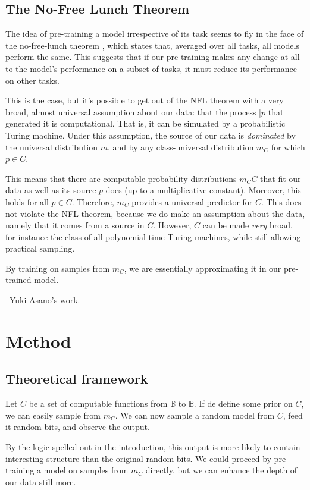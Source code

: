 \documentclass{article} %
\newcommand{\B}{\mathbb B}
\begin{document}
\subsection{The No-Free Lunch Theorem}

The idea of pre-training a model irrespective of its task seems to fly in the face of the no-free-lunch theorem \cite{}, which states that, averaged over all tasks, all models perform the same. This suggests that if our pre-training makes any change at all to the model's performance on a subset of tasks, it must reduce its performance on other tasks.

This is the case, but it's possible to get out of the NFL theorem with a very broad, almost universal assumption about our data: that the process |$p$ that generated it is computational. That is, it can be simulated by a probabilistic Turing machine. Under this assumption, the source of our data is \emph{dominated} by the universal distribution $m$, and by any class-universal distribution $m_C$ for which $p \in C$. 

This means that there are computable probability distributions $m_CC$ that fit our data as well as its source $p$ does (up to a multiplicative constant). Moreover, this holds for all $p \in C$. Therefore, $m_C$ provides a universal predictor for $C$. This does not violate the NFL theorem, because we do make an assumption about the data, namely that it comes from a source in $C$. However, $C$ can be made \emph{very} broad, for instance the class of all polynomial-time Turing machines, while still allowing practical sampling.

By training on samples from $m_C$, we are essentially approximating it in our pre-trained model.\footnotemark

--Yuki Asano's work.

\section{Method}

\subsection{Theoretical framework}

Let $C$ be a set of computable functions from $\B$ to $\B$. If de define some prior on $C$, we can easily sample from $m_C$. We can now sample a random model from $C$, feed it random bits, and observe the output.

By the logic spelled out in the introduction, this output is more likely to contain interesting structure than the original random bits. We could proceed by pre-training a model on samples from $m_C$ directly, but we can enhance the depth of our data still more. 
\end{document}
